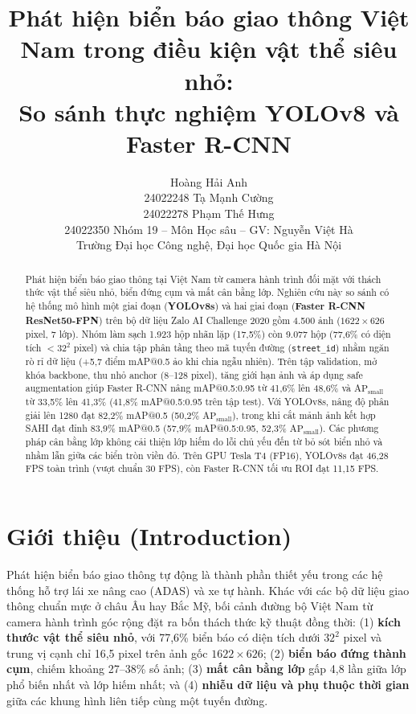 \documentclass[11pt]{article}
\title{Phát hiện biển báo giao thông Việt Nam trong điều kiện vật thể siêu nhỏ:\\
So sánh thực nghiệm YOLOv8 và Faster R-CNN}
\author{
Hoàng Hải Anh \\ 24022248
\And
Tạ Mạnh Cường \\ 24022278
\And
Phạm Thế Hưng \\ 24022350
\AND
Nhóm 19 -- Môn Học sâu -- GV: Nguyễn Việt Hà \\
Trường Đại học Công nghệ, Đại học Quốc gia Hà Nội
}
\begin{document}
\maketitle


\begin{abstract}
Phát hiện biển báo giao thông tại Việt Nam từ camera hành trình đối mặt với thách thức vật thể siêu nhỏ, biển đứng cụm và mất cân bằng lớp. Nghiên cứu này so sánh có hệ thống mô hình một giai đoạn (\textbf{YOLOv8s}) và hai giai đoạn (\textbf{Faster R-CNN ResNet50-FPN}) trên bộ dữ liệu Zalo AI Challenge 2020 gồm 4.500 ảnh ($1622 \times 626$ pixel, 7 lớp). Nhóm làm sạch 1.923 hộp nhãn lặp (17,5\%) còn 9.077 hộp (77,6\% có diện tích $<32^2$ pixel) và chia tập phân tầng theo mã tuyến đường (\texttt{street\_id}) nhằm ngăn rò rỉ dữ liệu (+5,7 điểm mAP@0.5 ảo khi chia ngẫu nhiên). Trên tập validation, mở khóa backbone, thu nhỏ anchor (8--128 pixel), tăng giới hạn ảnh và áp dụng safe augmentation giúp Faster R-CNN nâng mAP@0.5:0.95 từ 41,6\% lên 48,6\% và $\text{AP}_{\text{small}}$ từ 33,5\% lên 41,3\% (41,8\% mAP@0.5:0.95 trên tập test). Với YOLOv8s, nâng độ phân giải lên 1280 đạt 82,2\% mAP@0.5 (50,2\% $\text{AP}_{\text{small}}$), trong khi cắt mảnh ảnh kết hợp SAHI đạt đỉnh 83,9\% mAP@0.5 (57,9\% mAP@0.5:0.95, 52,3\% $\text{AP}_{\text{small}}$). Các phương pháp cân bằng lớp không cải thiện lớp hiếm do lỗi chủ yếu đến từ bỏ sót biển nhỏ và nhầm lẫn giữa các biển tròn viền đỏ. Trên GPU Tesla T4 (FP16), YOLOv8s đạt 46,28 FPS toàn trình (vượt chuẩn 30 FPS), còn Faster R-CNN tối ưu ROI đạt 11,15 FPS.
\end{abstract}


\section{Giới thiệu (Introduction)}

Phát hiện biển báo giao thông tự động là thành phần thiết yếu trong các hệ thống hỗ trợ lái xe nâng cao (ADAS) và xe tự hành. Khác với các bộ dữ liệu giao thông chuẩn mực ở châu Âu hay Bắc Mỹ, bối cảnh đường bộ Việt Nam từ camera hành trình góc rộng đặt ra bốn thách thức kỹ thuật đồng thời: (1) \textbf{kích thước vật thể siêu nhỏ}, với 77,6\% biển báo có diện tích dưới $32^2$ pixel và trung vị cạnh chỉ 16,5 pixel trên ảnh gốc $1622 \times 626$; (2) \textbf{biển báo đứng thành cụm}, chiếm khoảng 27--38\% số ảnh; (3) \textbf{mất cân bằng lớp} gấp 4,8 lần giữa lớp phổ biến nhất và lớp hiếm nhất; và (4) \textbf{nhiễu dữ liệu và phụ thuộc thời gian} giữa các khung hình liên tiếp cùng một tuyến đường.
\end{document}
